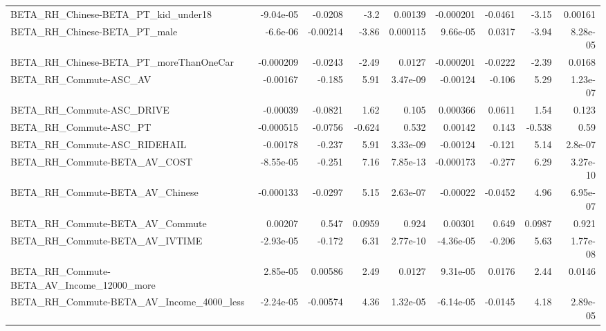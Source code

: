 \begin{tabular}{lrrrrrrrr}
BETA\_RH\_Chinese-BETA\_PT\_kid\_under18                &   -9.04e-05 &      -0.0208 &     -3.2 &  0.00139 &  -0.000201 &     -0.0461 &        -3.15 &       0.00161 \\
BETA\_RH\_Chinese-BETA\_PT\_male                       &    -6.6e-06 &     -0.00214 &    -3.86 & 0.000115 &   9.66e-05 &      0.0317 &        -3.94 &      8.28e-05 \\
BETA\_RH\_Chinese-BETA\_PT\_moreThanOneCar             &   -0.000209 &      -0.0243 &    -2.49 &   0.0127 &  -0.000201 &     -0.0222 &        -2.39 &        0.0168 \\
BETA\_RH\_Commute-ASC\_AV                             &    -0.00167 &       -0.185 &     5.91 & 3.47e-09 &   -0.00124 &      -0.106 &         5.29 &      1.23e-07 \\
BETA\_RH\_Commute-ASC\_DRIVE                          &    -0.00039 &      -0.0821 &     1.62 &    0.105 &   0.000366 &      0.0611 &         1.54 &         0.123 \\
BETA\_RH\_Commute-ASC\_PT                             &   -0.000515 &      -0.0756 &   -0.624 &    0.532 &    0.00142 &       0.143 &       -0.538 &          0.59 \\
BETA\_RH\_Commute-ASC\_RIDEHAIL                       &    -0.00178 &       -0.237 &     5.91 & 3.33e-09 &   -0.00124 &      -0.121 &         5.14 &       2.8e-07 \\
BETA\_RH\_Commute-BETA\_AV\_COST                       &   -8.55e-05 &       -0.251 &     7.16 & 7.85e-13 &  -0.000173 &      -0.277 &         6.29 &      3.27e-10 \\
BETA\_RH\_Commute-BETA\_AV\_Chinese                    &   -0.000133 &      -0.0297 &     5.15 & 2.63e-07 &   -0.00022 &     -0.0452 &         4.96 &      6.95e-07 \\
BETA\_RH\_Commute-BETA\_AV\_Commute                    &     0.00207 &        0.547 &   0.0959 &    0.924 &    0.00301 &       0.649 &       0.0987 &         0.921 \\
BETA\_RH\_Commute-BETA\_AV\_IVTIME                     &   -2.93e-05 &       -0.172 &     6.31 & 2.77e-10 &  -4.36e-05 &      -0.206 &         5.63 &      1.77e-08 \\
BETA\_RH\_Commute-BETA\_AV\_Income\_12000\_more          &    2.85e-05 &      0.00586 &     2.49 &   0.0127 &   9.31e-05 &      0.0176 &         2.44 &        0.0146 \\
BETA\_RH\_Commute-BETA\_AV\_Income\_4000\_less           &   -2.24e-05 &     -0.00574 &     4.36 & 1.32e-05 &  -6.14e-05 &     -0.0145 &         4.18 &      2.89e-05 \\

\end{tabular}
